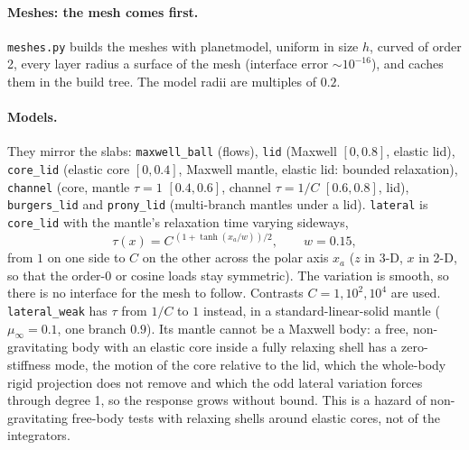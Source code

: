 \documentclass[11pt]{article}
\numberwithin{equation}{section}
\newcommand{\code}[1]{\texttt{#1}}
\begin{document}
\paragraph{Meshes: the mesh comes first.}
\code{meshes.py} builds the meshes with planetmodel, uniform in size $h$,
curved of order 2, every layer radius a surface of the mesh (interface
error $\sim10^{-16}$), and caches them in the build tree. The model radii
are multiples of $0.2$.

\paragraph{Models.}
They mirror the slabs: \code{maxwell\_ball} (flows), \code{lid} (Maxwell
$[0,0.8]$, elastic lid), \code{core\_lid} (elastic core $[0,0.4]$,
Maxwell mantle, elastic lid: bounded relaxation), \code{channel} (core,
mantle $\tau=1$ $[0.4,0.6]$, channel $\tau=1/C$ $[0.6,0.8]$, lid),
\code{burgers\_lid} and \code{prony\_lid} (multi-branch mantles under a
lid). \code{lateral} is \code{core\_lid} with the mantle's relaxation
time varying sideways,
\begin{equation}
  \tau(x) = C^{\,(1+\tanh(x_a/w))/2},\qquad w=0.15,
\end{equation}
from $1$ on one side to $C$ on the other across the polar axis $x_a$
($z$ in 3-D, $x$ in 2-D, so that the order-0 or cosine loads stay
symmetric). The variation is smooth, so there is no interface for the
mesh to follow. Contrasts $C=1,10^2,10^4$ are used. \code{lateral\_weak}
has $\tau$ from $1/C$ to $1$ instead, in a standard-linear-solid mantle
($\mu_\infty=0.1$, one branch $0.9$). Its mantle cannot be a Maxwell body:
a free, non-gravitating body with an elastic core inside a fully relaxing
shell has a zero-stiffness mode, the motion of the core relative to the
lid, which the whole-body rigid projection does not remove and which the
odd lateral variation forces through degree 1, so the response grows
without bound. This is a hazard of non-gravitating free-body tests with
relaxing shells around elastic cores, not of the integrators.
\end{document}
